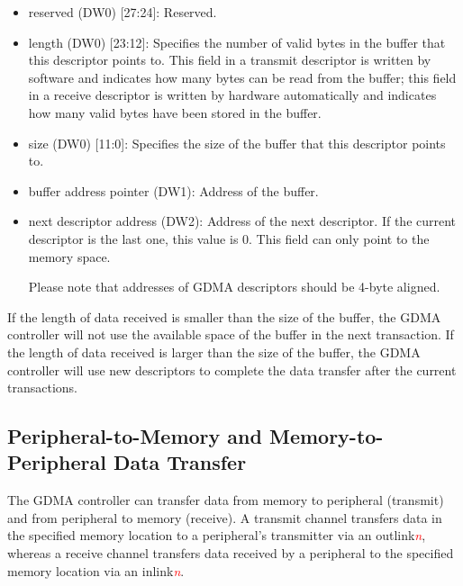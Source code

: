 \documentclass[main\_\_EN.tex]{subfiles}
\begin{document}
\begin{itemize}
    0: The received data does not have errors.\\
    1: The received data has errors.\\
    This bit is used only when UHCI or PARLIO uses the GDMA to receive data. When an error is detected in the received data segment corresponding to a descriptor, this bit in the receive descriptor is set to 1 by hardware.
    \item reserved (DW0) [27:24]: Reserved.
    \item length (DW0) [23:12]: Specifies the number of valid bytes in the buffer that this descriptor points to. This field in a transmit descriptor is written by software and indicates how many bytes can be read from the buffer; this field in a receive descriptor is written by hardware automatically and indicates how many valid bytes have been stored in the buffer.
    \item size (DW0) [11:0]: Specifies the size of the buffer that this descriptor points to.
    \item buffer address pointer (DW1): Address of the buffer.
    \item next descriptor address (DW2): Address of the next descriptor. If the current descriptor is the last one, this value is 0. This field can only point to the memory space.
        \begin{tiplisting}
            Please note that addresses of GDMA descriptors should be 4-byte aligned.
        \end{tiplisting}
\end{itemize}

If the length of data received is smaller than the size of the buffer, the GDMA controller will not use the available space of the buffer in the next transaction. If the length of data received is larger than the size of the buffer, the GDMA controller will use new descriptors to complete the data transfer after the current transactions.

\subsection{Peripheral-to-Memory and Memory-to-Peripheral Data Transfer}

The GDMA controller can transfer data from memory to peripheral (transmit) and from peripheral to memory (receive). A transmit channel transfers data in the specified memory location to a peripheral's transmitter via an outlink\textcolor{red}{\it{n}}, whereas a receive channel transfers data received by a peripheral to the specified memory location via an inlink\textcolor{red}{\it{n}}.
\end{document}
